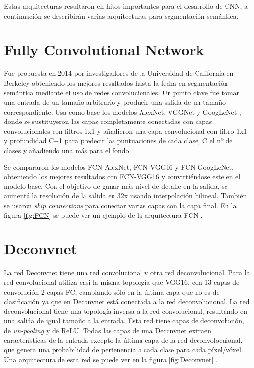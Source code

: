 Estas arquitecturas resultaron en hitos importantes para el desarrollo de CNN, a continuación se describirán varias arquitecturas para segmentación semántica.

\newpage\section{Fully Convolutional Network}\label{sec:fcn}

Fue propuesta en 2014 por investigadores de la Universidad de California en Berkeley \cite{Long2014} obteniendo los mejores resultados hasta la fecha en segmentación semántica mediante el uso de redes convolucionales. Un punto clave fue tomar una entrada de un tamaño arbitrario y producir una salida de un tamaño correspondiente. Usa como base los modelos AlexNet, VGGNet y GoogLeNet \cite{Szegedy2014}, donde se sustituyeron las capas completamente conectadas con capas convolucionales con filtros 1x1 y añadieron una capa convolucional con filtro 1x1 y profundidad C+1 para predecir las puntuaciones de cada clase, C el nº de clases y añadiendo una más para el fondo.

Se compararon los modelos FCN-AlexNet, FCN-VGG16 y FCN-GoogLeNet, obteniendo los mejores resultados con FCN-VGG16 y convirtiéndose este en el modelo base. Con el objetivo de ganar más nivel de detalle en la salida, se aumentó la resolución de la salida en 32x usando interpolación bilineal. También se usaron \textit{skip connections} para conectar varias capas con la capa final. En la figura \ref{fig:FCN} se puede ver un ejemplo de la arquitectura FCN \cite{Sultana2020}.



\section{Deconvnet}\label{sec:deconvnet}

La red Deconvnet \cite{Noh2015} tiene una red convolucional y otra red deconvolucional. Para la red convolucional utiliza casi la misma topología que VGG16, con 13 capas de convolución 2 capas FC, cambiando sólo en la última capa que no es de clasificación ya que en Deconvnet está conectada a la red deconvolucional. La red deconvolucional tiene una topología inversa a la red convolucional, resultando en una salida de igual tamaño a la entrada. Esta red tiene capas de deconvolución, de \textit{un-pooling} y de ReLU. Todas las capas de una Deconvnet extraen características de la entrada excepto la última capa de la red deconvolocuional, que genera una probabilidad de pertenencia a cada clase para cada píxel/vóxel. Una arquitectura de esta red se puede ver en la figura \ref{fig:Deconvnet} \cite{Noh2015}.

